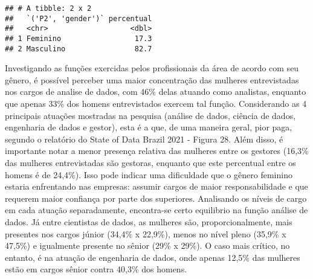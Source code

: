 \documentclass[
]{article}
\begin{document}
\begin{verbatim}
## # A tibble: 2 x 2
##   `('P2', 'gender')` percentual
##   <chr>                   <dbl>
## 1 Feminino                 17.3
## 2 Masculino                82.7
\end{verbatim}

Investigando as funções exercidas pelos profissionais da área de acordo
com seu gênero, é possível perceber uma maior concentração das mulheres
entrevistadas nos cargos de analise de dados, com 46\% delas atuando
como analistas, enquanto que apenas 33\% dos homens entrevistados
exercem tal função. Considerando as 4 principais atuações mostradas na
pesquisa (análise de dados, ciência de dados, engenharia de dados e
gestor), esta é a que, de uma maneira geral, pior paga, segundo o
relatório do State of Data Brazil 2021 - Figura 28. Além disso, é
importante notar a menor presença relativa das mulheres entre os
gestores (16,3\% das mulheres entrevistadas são gestoras, enquanto que
este percentual entre os homens é de 24,4\%). Isso pode indicar uma
dificuldade que o gênero feminino estaria enfrentando nas empresas:
assumir cargos de maior responsabilidade e que requerem maior confiança
por parte dos superiores. Analisando os níveis de cargo em cada atuação
separadamente, encontra-se certo equilibrio na função análise de dados.
Já entre cientistas de dados, as mulheres são, proporcionalmente, mais
presentes nos cargos júnior (34,4\% x 22,9\%), menos no nível pleno
(35,9\% x 47,5\%) e igualmente presente no sênior (29\% x 29\%). O caso
mais crítico, no entanto, é na atuação de engenharia de dados, onde
apenas 12,5\% das mulheres estão em cargos sênior contra 40,3\% dos
homens.
\end{document}
